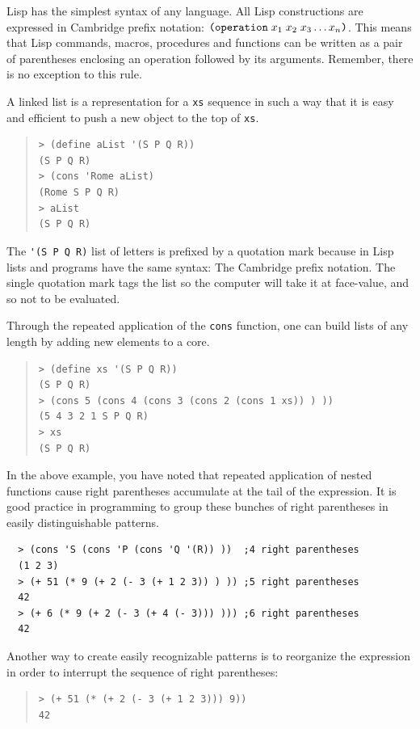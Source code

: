 \documentclass[a4paper,12pt]{book}
\begin{document}
Lisp has the simplest syntax
of any language. All
Lisp constructions are expressed
in Cambridge prefix notation:
$\verb|(operation|\;x_1\;x_2\;x_3\ldots x_n\verb|)|$.
This means that Lisp commands,
macros, procedures and functions
can be written  as a pair of parentheses
enclosing an operation followed
by its arguments. Remember, there is no
exception to this rule.

A linked list is a representation for
a \verb|xs| sequence  in such a way
that it is easy and efficient to
push a new object to the top of \verb|xs|.
\begin{quote}
\begin{verbatim}
> (define aList '(S P Q R))
(S P Q R)
> (cons 'Rome aList)
(Rome S P Q R)
> aList
(S P Q R)
\end{verbatim}
\end{quote}
The \verb|'(S P Q R)| list of letters
is prefixed by a quotation mark because
in Lisp lists and programs have the
same syntax: The Cambridge prefix notation.
The single quotation mark
tags the list so the computer will
take it at face-value, and so not to be evaluated.

Through the repeated application of the
\verb|cons| function, one can
build lists of any length
by adding new elements to
a core.
\begin{quote}
\begin{verbatim}
> (define xs '(S P Q R))
(S P Q R)
> (cons 5 (cons 4 (cons 3 (cons 2 (cons 1 xs)) ) ))
(5 4 3 2 1 S P Q R)
> xs
(S P Q R)
\end{verbatim}
\end{quote}
In the above example, you have noted
that repeated application of nested functions
cause right parentheses accumulate
at the tail of the expression.
It is good practice in programming
to group these bunches of right parentheses
in easily distinguishable patterns.

\begin{verbatim}
  > (cons 'S (cons 'P (cons 'Q '(R)) ))  ;4 right parentheses
  (1 2 3)
  > (+ 51 (* 9 (+ 2 (- 3 (+ 1 2 3)) ) )) ;5 right parentheses
  42 
  > (+ 6 (* 9 (+ 2 (- 3 (+ 4 (- 3))) ))) ;6 right parentheses
  42
\end{verbatim}

Another way to create easily recognizable
patterns  is to
reorganize the expression in order
to interrupt the sequence
of right parentheses:
\begin{quote}
\begin{verbatim}
> (+ 51 (* (+ 2 (- 3 (+ 1 2 3))) 9))
42
\end{verbatim}
\end{quote}
\end{document}

